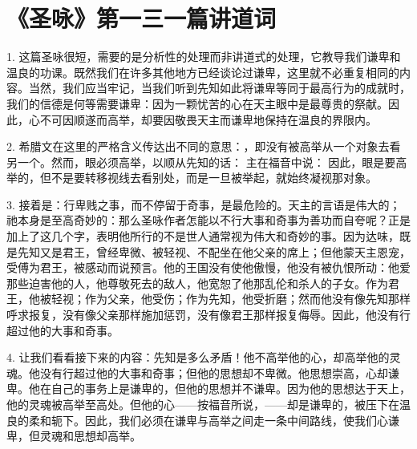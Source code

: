 

\section{《圣咏》第一三一篇讲道词}

\par

1. 这篇圣咏很短，需要的是分析性的处理而非讲道式的处理，它教导我们谦卑和温良的功课。既然我们在许多其他地方已经谈论过谦卑，这里就不必重复相同的内容。当然，我们应当牢记，当我们听到先知如此将谦卑等同于最高行为的成就时，我们的信德是何等需要谦卑：因为一颗忧苦的心在天主眼中是最尊贵的祭献。因此，心不可因顺遂而高举，却要因敬畏天主而谦卑地保持在温良的界限内。\par

2. 希腊文在这里的严格含义传达出不同的意思：，即没有被高举从一个对象去看另一个。然而，眼必须高举，以顺从先知的话： 主在福音中说： 因此，眼是要高举的，但不是要转移视线去看别处，而是一旦被举起，就始终凝视那对象。\par

3. 接着是：行卑贱之事，而不停留于奇事，是最危险的。天主的言语是伟大的；祂本身是至高奇妙的：那么圣咏作者怎能以不行大事和奇事为善功而自夸呢？正是加上了这几个字，表明他所行的不是世人通常视为伟大和奇妙的事。因为达味，既是先知又是君王，曾经卑微、被轻视、不配坐在他父亲的席上；但他蒙天主恩宠，受傅为君王，被感动而说预言。他的王国没有使他傲慢，他没有被仇恨所动：他爱那些迫害他的人，他尊敬死去的敌人，他宽恕了他那乱伦和杀人的子女。作为君王，他被轻视；作为父亲，他受伤；作为先知，他受折磨；然而他没有像先知那样呼求报复，没有像父亲那样施加惩罚，没有像君王那样报复侮辱。因此，他没有行超过他的大事和奇事。\par

4. 让我们看看接下来的内容：先知是多么矛盾！他不高举他的心，却高举他的灵魂。他没有行超过他的大事和奇事；但他的思想却不卑微。他思想崇高，心却谦卑。他在自己的事务上是谦卑的，但他的思想并不谦卑。因为他的思想达于天上，他的灵魂被高举至高处。但他的心——按福音所说，——却是谦卑的，被压下在温良的柔和轭下。因此，我们必须在谦卑与高举之间走一条中间路线，使我们心谦卑，但灵魂和思想却高举。\par

